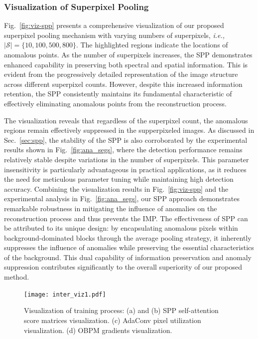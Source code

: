 \subsubsection{Visualization of Superpixel Pooling}
Fig.~\ref{fig:viz-spp} presents a comprehensive visualization of our proposed superpixel pooling mechanism with varying numbers of superpixels, \textit{i.e.,} $|\mathcal{S}|=\{10, 100, 500, 800\}$. The highlighted regions indicate the locations of anomalous points. As the number of superpixels increases, the SPP demonstrates enhanced capability in preserving both spectral and spatial information. This is evident from the progressively detailed representation of the image structure across different superpixel counts. However, despite this increased information retention, the SPP consistently maintains its fundamental characteristic of effectively eliminating anomalous points from the reconstruction process. 

The visualization reveals that regardless of the superpixel count, the anomalous regions remain effectively suppressed in the supperpixeled images. As discussed in Sec.~\ref{sec:spp}, the stability of the SPP is also corroborated by the experimental results shown in Fig.~\ref{fig:ana_segs}, where the detection performance remains relatively stable despite variations in the number of superpixels. This parameter insensitivity is particularly advantageous in practical applications, as it reduces the need for meticulous parameter tuning while maintaining high detection accuracy. Combining the visualization results in Fig.~\ref{fig:viz-spp} and the experimental analysis in Fig.~\ref{fig:ana_segs}, our SPP approach demonstrates remarkable robustness in mitigating the influence of anomalies on the reconstruction process and thus prevents the IMP. The effectiveness of SPP can be attributed to its unique design: by encapsulating anomalous pixels within background-dominated blocks through the average pooling strategy, it inherently suppresses the influence of anomalies while preserving the essential characteristics of the background. This dual capability of information preservation and anomaly suppression contributes significantly to the overall superiority of our proposed method.



\begin{figure}[htbp]
  \centering
  \texttt{[image: inter\_viz1.pdf]}
  \caption{Visualization of training process: (a) and (b) SPP self-attention score matrices visualization. (c) AdaConv pixel utilization visualization. (d) OBPM  gradients visualization.}
  \label{fig:inter-viz}
\end{figure}


